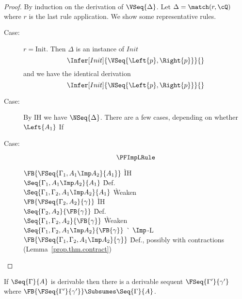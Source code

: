 \begin{proof}
  By induction on the derivation of $\VSeq{\Delta}$.
  Let $\Delta = \match(r, \cQ)$ where $r$ is the last
  rule application.  We show some representative rules.
  \begin{description}
  \item[Case:]
    $r = \mbox{Init}$.
    Then $\Delta$ is an instance of $Init$
    \[ \Infer[Init]{\VSeq{\Left{p},\Right{p}}}{} \]
    and we have the identical derivation
    \[ \Infer[Init]{\NSeq{\Left{p},\Right{p}}}{} \]
  \item[Case:]
    {}
    By IH we have $\NSeq{\Delta}$.  There are a few cases, depending
    on whether $\Left{A_1}$
    If

  \item[Case:]
    \[ \PFImpLRule \]
    \begin{tabbing}
      $\FB{\FSeq{\Gamma_1, A_1\Imp A_2}{A_1}}$ \` IH \\
      $\Seq{\Gamma_1, A_1\Imp A_2}{A_1}$ \` Def. \\
      $\Seq{\Gamma_1, \Gamma_2, A_1\Imp A_2}{A_1}$ \` Weaken \\
      $\FB{\FSeq{\Gamma_2, A_2}{\gamma}}$ \` IH \\
      $\Seq{\Gamma_2, A_2}{\FB{\gamma}}$ \` Def. \\
      $\Seq{\Gamma_1, \Gamma_2, A_2}{\FB{\gamma}}$ \` Weaken \\
      $\Seq{\Gamma_1, \Gamma_2, A_1\Imp A_2}{\FB{\gamma}}$ \` $\Imp$-L\\
      $\FB{\FSeq{\Gamma_1, \Gamma_2, A_1\Imp A_2}{\gamma}}$
      \` Def., possibly with contractions (Lemma~\ref{prop.thm.contract})\\
    \end{tabbing}
  \end{description}
\end{proof}

\begin{theorem}[Completeness]
  \label{prop.thm.forward-complete}
  If $\Seq{\Gamma}{A}$ is derivable then there is a derivable
  sequent $\FSeq{\Gamma'}{\gamma'}$ where
  $\FB{\FSeq{\Gamma'}{\gamma'}}\Subsumes \Seq{\Gamma}{A}$.
\end{theorem}

